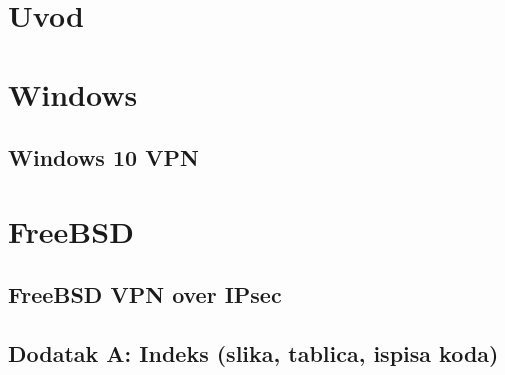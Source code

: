 \documentclass[a4paper, 12pt]{article}
\begin{document}
\thispagestyle{fancy}
	

	\addtocounter{page}{1}

	\newpage
	\tableofcontents
	
	\newpage
	\section{Uvod}
	

	\newpage
	\section{Windows}
	\subsection{Windows 10 VPN}
	
	
	\newpage
	\section{FreeBSD}
	\subsection{FreeBSD VPN over IPsec}
	

	\newpage
	
	
	

	\newpage
	\begin{appendices}
		\section{Dodatak A: Indeks (slika, tablica, ispisa koda)}
			\renewcommand\listfigurename{}
			\listoffigures
		


	\end{appendices}
	
\end{document}
